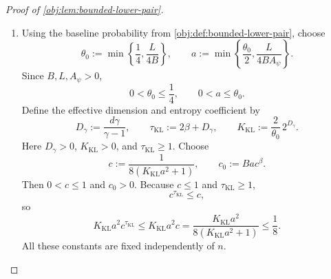 \documentclass[11pt]{article}
\begin{document}
\begin{proof}[Proof of \cref{obj:lem:bounded-lower-pair}]
\begin{enumerate}
For \(0<h\le1\), define the scaled bump by
\[
\psi_h(x):=h^\beta\psi((x-x_0)/h),
\qquad x\in\mathbb R^d.
\]
Translation and dilation give, for \(0\le\kappa\le m\),
\[
\mathrm d^\kappa\psi_h(x)
=h^\beta h^{-\kappa}\mathscr J_\kappa((x-x_0)/h),
\]
and hence
\[
\|\mathrm d^\kappa\psi_h(x)\|
\le h^{\beta-\kappa}M_{\psi,\kappa}
\le M_{\psi,\kappa}.
\]
For the top derivative, the preceding modulus bound yields
\[
\begin{aligned}
\|\mathrm d^m\psi_h(x)-\mathrm d^m\psi_h(x')\|
&\le h^{\beta-m}M_{\psi,\mathrm{mod}}
       \left(\frac{\|x-x'\|_\infty}{h}\right)^{\sigma_\beta}\\
&=M_{\psi,\mathrm{mod}}\|x-x'\|_\infty^{\sigma_\beta},
\end{aligned}
\]
since \(\beta-m=\sigma_\beta\). Set
\[
A_\psi:=
\max\left\{
1,\,
\max\left\{
\sum_{\kappa=0}^{m}M_{\psi,\kappa},
M_{\psi,\mathrm{mod}}
\right\}
\right\}>0.
\]
Coordinate derivatives are evaluations of these multilinear derivatives on coordinate unit vectors, so their magnitudes and differences are bounded by the corresponding operator norms. Restricting the ambient smooth functions to the cube supplies their continuous boundary traces. Therefore, with the convention of \cref{obj:def:holder},
\[
\psi_h|_{\mathcal X}\in\mathcal H^\beta(A_\psi)
\qquad
\text{for every }0<h\le1,
\quad \mathcal X=[0,1]^d.
\]

\item Using the baseline probability from \cref{obj:def:bounded-lower-pair}, choose
\[
\theta_0:=\min\left\{\frac14,\frac{L}{4B}\right\},
\qquad
a:=\min\left\{\frac{\theta_0}{2},\frac{L}{4BA_\psi}\right\}.
\]
Since \(B,L,A_\psi>0\),
\[
0<\theta_0\le\frac14,
\qquad
0<a\le\theta_0.
\]
Define the effective dimension and entropy coefficient by
\[
D_\gamma:=\frac{d\gamma}{\gamma-1},
\qquad
\tau_{\mathrm{KL}}:=2\beta+D_\gamma,
\qquad
K_{\mathrm{KL}}:=\frac{2}{\theta_0}\,2^{D_\gamma}.
\]
Here \(D_\gamma>0\), \(K_{\mathrm{KL}}>0\), and
\(\tau_{\mathrm{KL}}\ge1\). Choose
\[
c:=\frac{1}{8(K_{\mathrm{KL}}a^2+1)},
\qquad
c_0:=Bac^\beta.
\]
Then \(0<c\le1\) and \(c_0>0\). Because \(c\le1\) and
\(\tau_{\mathrm{KL}}\ge1\),
\[
c^{\tau_{\mathrm{KL}}}\le c,
\]
so
\[
K_{\mathrm{KL}}a^2c^{\tau_{\mathrm{KL}}}
\le K_{\mathrm{KL}}a^2c
=\frac{K_{\mathrm{KL}}a^2}{8(K_{\mathrm{KL}}a^2+1)}
\le\frac18.
\]
All these constants are fixed independently of \(n\).


\end{enumerate}
\end{proof}
\end{document}
